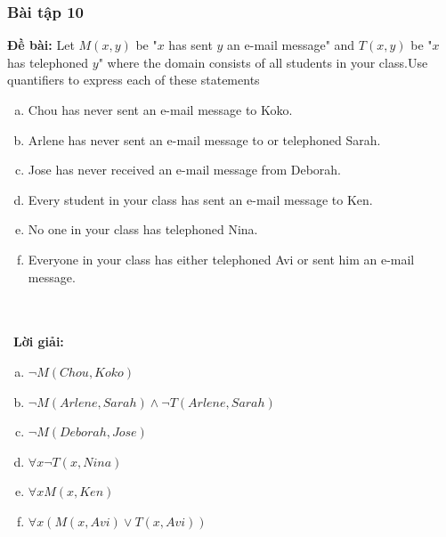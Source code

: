 \documentclass[a4paper]{article}
\begin{document}
\subsubsection{Bài tập 10}
\textbf{Đề bài:} Let $M(x,y)$ be "$x$ has sent $y$ an e-mail message" and $T(x,y)$ be "$x$ has telephoned $y$" where the domain consists of all students in your class.Use quantifiers to express each of these statements
\begin{enumerate}[a)]
	\item Chou has never sent an e-mail message to Koko.
	\item Arlene has never sent an e-mail message to or telephoned Sarah.
	\item Jose has never received an e-mail message from Deborah.
	\item Every student in your class has sent an e-mail message to Ken.
	\item No one in your class has telephoned Nina.
	\item Everyone in your class has either telephoned Avi or sent him an e-mail message.
	\end{enumerate}
\\\ \\\
\textbf{Lời giải:} \begin{enumerate}[a)]
	\item $\lnot M(Chou,Koko)$
	\item $\lnot M(Arlene,Sarah) \land \lnot T(Arlene,Sarah)$
	\item  $\lnot M(Deborah,Jose)$
	\item $\forall x \lnot T(x,Nina)$
	\item $\forall x M(x,Ken)$
	\item $\forall x (M(x,Avi) \lor T(x,Avi))$
	\end{enumerate} \\\ \\\
\clearpage
\end{document}
